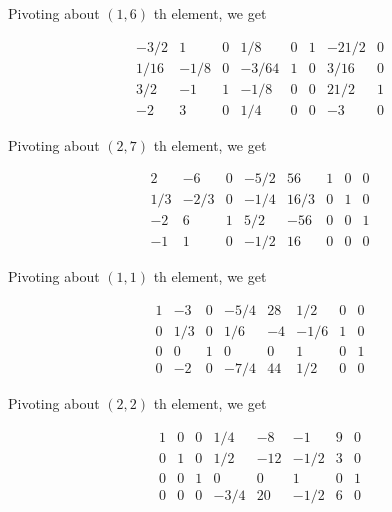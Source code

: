 Pivoting about \((1,6)\) th element, we get

\begin{equation*}
	\begin{array}{cccccccc}
		-3 / 2 & 1 & 0 & 1 / 8 & 0 & 1 & -21 / 2 & 0 \\
		1 / 16 & -1 / 8 & 0 & -3 / 64 & 1 & 0 & 3 / 16 & 0 \\
		3 / 2 & -1 & 1 & -1 / 8 & 0 & 0 & 21 / 2 & 1 \\
		-2 & 3 & 0 & 1 / 4 & 0 & 0 & -3 & 0
	\end{array}
\end{equation*}

Pivoting about \((2,7)\) th element, we get

\begin{equation*}
	\begin{array}{cccccccc}
		2 & -6 & 0 & -5 / 2 & 56 & 1 & 0 & 0 \\
		1 / 3 & -2 / 3 & 0 & -1 / 4 & 16 / 3 & 0 & 1 & 0 \\
		-2 & 6 & 1 & 5 / 2 & -56 & 0 & 0 & 1 \\
		-1 & 1 & 0 & -1 / 2 & 16 & 0 & 0 & 0
	\end{array}
\end{equation*}

Pivoting about \((1,1)\) th element, we get

\begin{equation*}
	\begin{array}{cccccccc}
		1 & -3 & 0 & -5 / 4 & 28 & 1 / 2 & 0 & 0 \\
		0 & 1 / 3 & 0 & 1 / 6 & -4 & -1 / 6 & 1 & 0 \\
		0 & 0 & 1 & 0 & 0 & 1 & 0 & 1 \\
		0 & -2 & 0 & -7 / 4 & 44 & 1 / 2 & 0 & 0
	\end{array}
\end{equation*}

Pivoting about \((2,2)\) th element, we get

\begin{equation*}
	\begin{array}{cccccccc}
		1 & 0 & 0 & 1 / 4 & -8 & -1 & 9 & 0 \\
		0 & 1 & 0 & 1 / 2 & -12 & -1 / 2 & 3 & 0 \\
		0 & 0 & 1 & 0 & 0 & 1 & 0 & 1 \\
		0 & 0 & 0 & -3 / 4 & 20 & -1 / 2 & 6 & 0
	\end{array}
\end{equation*}

